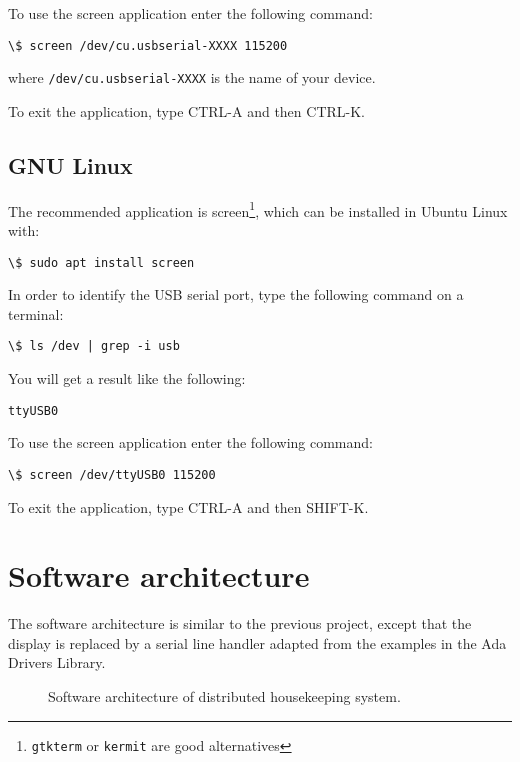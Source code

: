 To use the screen application enter the following command:
\begin{verbatim}
\$ screen /dev/cu.usbserial-XXXX 115200
\end{verbatim}

where {\tt /dev/cu.usbserial-XXXX} is the name of your device.

To exit the application, type CTRL-A and then CTRL-K.

\subsection{GNU Linux}

The recommended application is screen\footnote{{\tt gtkterm} or {\tt kermit} are good alternatives}, which can be installed in Ubuntu Linux with:
\begin{verbatim}
\$ sudo apt install screen
\end{verbatim}

In order to identify the USB serial port, type the following command on a terminal:

\begin{verbatim}
\$ ls /dev | grep -i usb
\end{verbatim}

You will get a result like the following:
\begin{verbatim}
ttyUSB0
\end{verbatim}

To use the screen application enter the following command:

\begin{verbatim}
\$ screen /dev/ttyUSB0 115200
\end{verbatim}

To exit the application, type CTRL-A and then SHIFT-K.

\section{Software architecture}

The software architecture is similar to the previous project, except that the display is replaced by a serial line handler adapted from the examples in the Ada Drivers Library.


\begin{figure}[h]
            \caption{Software architecture of distributed housekeeping system.}
            \label{fig:distributed}
\end{figure}

